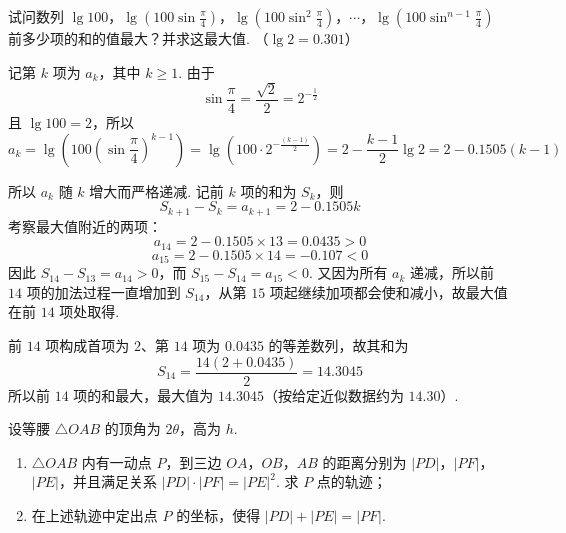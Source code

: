 \begin{problem}
试问数列 \(\lg 100\)，\(\lg \left(100\sin \frac{\pi}{4}\right)\)，\(\lg \left(100\sin^{2}\frac{\pi}{4}\right)\)，\(\cdots\)，\(\lg \left(100\sin^{n-1}\frac{\pi}{4}\right)\) 前多少项的和的值最大？并求这最大值. （\(\lg 2 = 0.301\)）
\end{problem}

\begin{solution}
记第 \(k\) 项为 \(a_k\)，其中 \(k\geq1\). 由于
\[
\sin\frac{\pi}{4}=\frac{\sqrt{2}}{2}=2^{-\frac{1}{2}}
\]
且 \(\lg100=2\)，所以
\[
a_k=\lg\left(100\left(\sin\frac{\pi}{4}\right)^{k-1}\right)
=\lg\left(100\cdot2^{-\frac{(k-1)}{2}}\right)
=2-\frac{k-1}{2}\lg2
=2-0.1505(k-1)
\]

所以 \(a_k\) 随 \(k\) 增大而严格递减. 记前 \(k\) 项的和为 \(S_k\)，则
\[
S_{k+1}-S_k=a_{k+1}=2-0.1505k
\]
考察最大值附近的两项：
\[
a_{14}=2-0.1505\times13=0.0435>0
\]
\[
a_{15}=2-0.1505\times14=-0.107<0
\]
因此 \(S_{14}-S_{13}=a_{14}>0\)，而 \(S_{15}-S_{14}=a_{15}<0\). 又因为所有 \(a_k\) 递减，所以前 \(14\) 项的加法过程一直增加到 \(S_{14}\)，从第 \(15\) 项起继续加项都会使和减小，故最大值在前 \(14\) 项处取得.

前 \(14\) 项构成首项为 \(2\)、第 \(14\) 项为 \(0.0435\) 的等差数列，故其和为
\[
S_{14}=\frac{14(2+0.0435)}{2}=14.3045
\]
所以前 \(14\) 项的和最大，最大值为 \(14.3045\)（按给定近似数据约为 \(14.30\)）.
\end{solution}

\begin{problem}
设等腰 \(\triangle OAB\) 的顶角为 \(2\theta\)，高为 \(h\).

\begin{enumerate}
\item \(\triangle OAB\) 内有一动点 \(P\)，到三边 \(OA\)，\(OB\)，\(AB\) 的距离分别为 \(\lvert PD\rvert\)，\(\lvert PF\rvert\)，\(\lvert PE\rvert\)，并且满足关系 \(\lvert PD\rvert \cdot \lvert PF\rvert = \lvert PE\rvert^2\). 求 \(P\) 点的轨迹；
\item 在上述轨迹中定出点 \(P\) 的坐标，使得 \(\lvert PD\rvert + \lvert PE\rvert = \lvert PF\rvert\).
\end{enumerate}
\end{problem}

